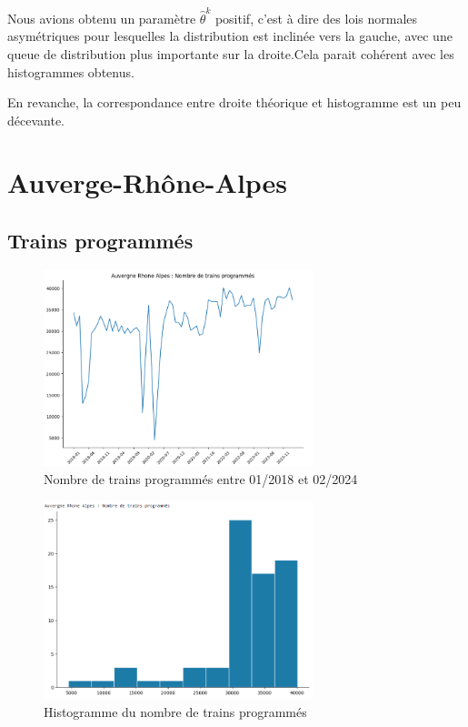 {Nous avions obtenu un paramètre $\hat{\theta}^k$ positif, c'est à dire des lois normales asymétriques pour lesquelles la distribution est inclinée vers la gauche, avec une queue de distribution plus importante sur la droite.Cela parait cohérent avec les histogrammes obtenus. 

En revanche, la correspondance entre droite théorique et histogramme est un peu décevante.

\section{Auverge-Rhône-Alpes}


\subsection{Trains programmés}

\begin{figure}[H]
  \centering
  \includegraphics[width=0.7\textwidth]{image/ARA_TP_1.png}
  \caption{Nombre de trains programmés entre 01/2018 et 02/2024}
\end{figure}

\begin{figure}[H]
  \centering
  \includegraphics[width=0.7\textwidth]{image/ARA_TP_2.png}
  \caption{Histogramme du nombre de trains programmés}
\end{figure}

}
